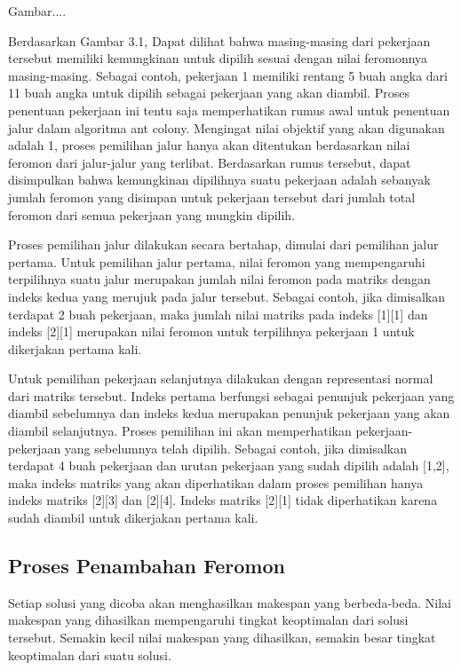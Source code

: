 Gambar....

	Berdasarkan Gambar 3.1, Dapat dilihat bahwa masing-masing dari pekerjaan tersebut memiliki
	kemungkinan untuk dipilih sesuai dengan nilai feromonnya masing-masing. Sebagai contoh, 
	pekerjaan 1 memiliki rentang 5 buah angka dari 11 buah angka untuk dipilih sebagai pekerjaan
	yang akan diambil. Proses penentuan pekerjaan ini tentu saja memperhatikan rumus awal untuk penentuan 
	jalur dalam algoritma ant colony. Mengingat nilai objektif yang akan digunakan adalah 1, proses pemilihan 
	jalur hanya akan ditentukan berdasarkan nilai feromon dari jalur-jalur yang terlibat. Berdasarkan rumus tersebut, 
	dapat disimpulkan bahwa kemungkinan dipilihnya suatu pekerjaan adalah sebanyak jumlah feromon yang disimpan untuk 
	pekerjaan tersebut dari jumlah total feromon dari semua pekerjaan yang mungkin dipilih.


	Proses pemilihan jalur dilakukan secara bertahap, dimulai dari pemilihan jalur pertama. Untuk
	pemilihan jalur pertama, nilai feromon yang mempengaruhi terpilihnya suatu jalur merupakan
	jumlah nilai feromon pada matriks dengan indeks kedua yang merujuk pada jalur tersebut. Sebagai
	contoh, jika dimisalkan terdapat 2 buah pekerjaan, maka jumlah nilai matriks pada indeks [1][1]
	dan indeks [2][1] merupakan nilai feromon untuk terpilihnya pekerjaan 1 untuk dikerjakan pertama
	kali.


	Untuk pemilihan pekerjaan selanjutnya dilakukan dengan representasi normal dari matriks tersebut.
	Indeks pertama berfungsi sebagai penunjuk pekerjaan yang diambil sebelumnya dan indeks
	kedua merupakan penunjuk pekerjaan yang akan diambil selanjutnya. Proses pemilihan ini akan
	memperhatikan pekerjaan-pekerjaan yang sebelumnya telah dipilih. Sebagai contoh, jika dimisalkan
	terdapat 4 buah pekerjaan dan urutan pekerjaan yang sudah dipilih adalah [1,2], maka indeks matriks
	yang akan diperhatikan dalam proses pemilihan hanya indeks matriks [2][3] dan [2][4]. Indeks
	matriks [2][1] tidak diperhatikan karena sudah diambil untuk dikerjakan pertama kali.


\subsection{Proses Penambahan Feromon}

	Setiap solusi yang dicoba akan menghasilkan makespan yang berbeda-beda. Nilai makespan yang
	dihasilkan mempengaruhi tingkat keoptimalan dari solusi tersebut. Semakin kecil nilai makespan
	yang dihasilkan, semakin besar tingkat keoptimalan dari suatu solusi.

